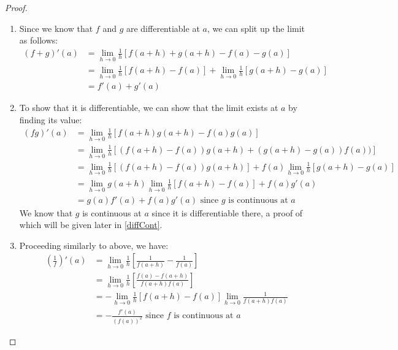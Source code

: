 \documentclass[../main.tex]{subfiles}
\begin{document}
\begin{proof}
  \begin{enumerate}
    \item Since we know that $f$ and $g$ are differentiable at $a$, we can split up the limit as follows:
      \begin{align*}
        (f + g)'(a) &= \lim_{h \to 0} \frac{1}{h} [f(a + h) + g(a + h) - f(a) - g(a)] \\
                    &= \lim_{h \to 0} \frac{1}{h} [f(a + h) - f(a)] + \lim_{h \to 0} \frac{1}{h} [g(a + h) - g(a)] \\
                    &= f'(a) + g'(a)
      \end{align*}
    \item
      To show that it is differentiable, we can show that the limit exists at $a$ by finding its value:
      \begin{align*}
        (fg)'(a) &= \lim_{h \to 0} \frac{1}{h}[f(a + h)g(a + h) - f(a)g(a)] \\
                 &= \lim_{h \to 0} \frac{1}{h}[(f(a + h) - f(a))g(a + h) + (g(a + h) - g(a))f(a))] \\
                 &= \lim_{h \to 0} \frac{1}{h}[(f(a + h) - f(a))g(a + h)] + f(a) \lim_{h \to 0} \frac{1}{h}[g(a + h) - g(a)] \\
                 &= \lim_{h \to 0} g(a + h) \lim_{h \to 0} \frac{1}{h}[f(a + h) - f(a)] + f(a)g'(a) \\
                 &= g(a) f'(a) + f(a)g'(a) \text{ since $g$ is continuous at $a$}
      \end{align*}
      We know that $g$ is continuous at $a$ since it is differentiable there, a proof of which will be given later in \cref{diffCont}.
    \item
      Proceeding similarly to above, we have:
      \begin{align*}
        \left(\frac{1}{f}\right)'(a) &= \lim_{h \to 0} \frac{1}{h} \left[\frac{1}{f(a + h)} - \frac{1}{f(a)}\right] \\
                                     &= \lim_{h \to 0} \frac{1}{h} \left[\frac{f(a) - f(a + h)}{f(a + h)f(a)}\right] \\
                                     &= -\lim_{h \to 0} \frac{1}{h} [f(a + h) - f(a)] \lim_{h \to 0} \frac{1}{f(a + h)f(a)} \\
                                     &= -\frac{f'(a)}{(f(a))^2} \text{ since $f$ is continuous at $a$}
      \end{align*}
  \end{enumerate}
\end{proof}
\end{document}
